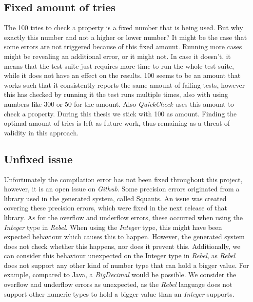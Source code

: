 \subsection*{Fixed amount of tries}
The 100 tries to check a property is a fixed number that is being used. But why exactly this number and not a higher or lower number? It might be the case that some errors are not triggered because of this fixed amount. Running more cases might be revealing an additional error, or it might not. In case it doesn't, it means that the test suite just requires more time to run the whole test suite, while it does not have an effect on the results. 100 seems to be an amount that works such that it consistently reports the same amount of failing tests, however this has checked by running it the test runs multiple times, also with using numbers like 300 or 50 for the amount. Also \textit{QuickCheck} uses this amount to check a property. During this thesis we stick with 100 as amount. Finding the optimal amount of tries is left as future work, thus remaining as a threat of validity in this approach.

\subsection*{Unfixed issue}
Unfortunately the compilation error has not been fixed throughout this project, however, it is an open issue on \textit{Github}. Some precision errors originated from a library used in the generated system, called Squants. An issue was created covering these precision errors, which were fixed in the next release of that library. As for the overflow and underflow errors, these occurred when using the \textit{Integer} type in \textit{Rebel}. When using the \textit{Integer} type, this might have been expected behaviour which causes this to happen. However, the generated system does not check whether this happens, nor does it prevent this. Additionally, we can consider this behaviour unexpected on the Integer type in
\textit{Rebel}, as \textit{Rebel} does not support any other kind of number type that can hold a bigger value. For example, compared to
Java, a \textit{BigDecimal} would be possible. We consider the overflow and underflow errors as unexpected, as the \textit{Rebel} language does not support other numeric types to hold a bigger value than an \textit{Integer} supports.
